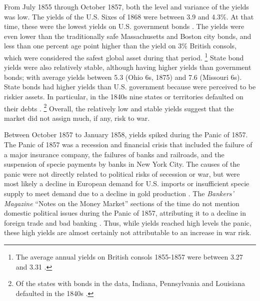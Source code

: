 \documentclass[]{article}\usepackage[]{graphicx}\usepackage[]{color}
\begin{document}
From July 1855 through October 1857, both the level and variance of the yields was low.
The yields of the U.S. Sixes of 1868 were between 3.9 and 4.3\%.
At that time, these were the lowest yields on U.S. government bonds \parencite[282-283]{HomerSylla2005}.
The yields were even lower than the traditionally safe Massachusetts and Boston city bonds, and less than one percent age point higher than the yield on 3\% British consols, which were considered the safest global asset during that period.%
\footnote{The average annual yields on British consols 1855-1857 were between 3.27 and 3.31 \parencite[193]{HomerSylla2005}.}
State bond yields were also relatively stable, although having higher yields than government bonds; with average yields between 5.3 (Ohio 6s, 1875) and 7.6 (Missouri 6s).
State bonds had higher yields than U.S. government because were perceived to be riskier assets.
In particular, in the 1840s nine states or territories defaulted on their debts \parencite{English1996}.%
\footnote{Of the states with bonds in the data, Indiana, Pennsylvania and Louisiana defaulted in the 1840s \parencite[265]{English1996}.}
Overall, the relatively low and stable yields suggest that the market did not assign much, if any, risk to war.

Between October 1857 to January 1858, yields spiked during the Panic of 1857.
The Panic of 1857 was a recession and financial crisis that included the failure of a major insurance company, the failures of banks and railroads, and the suspension of specie payments by banks in New York City.
The causes of the panic were not directly related to political risks of secession or war, but were most likely a decline in European demand for U.S. imports or insufficient specie supply to meet demand due to a decline in gold production \parencites[263-265]{Dewey1918}[277,299]{HomerSylla2005}[337]{BankersMagazine1857}.
The \textit{Bankers' Magazine} ``Notes on the Money Market'' sections of the time do not mention domestic political issues during the Panic of 1857, attributing it to a decline in foreign trade and bad banking \parencite[337]{BankersMagazine1857}.
Thus, while yields reached high levels the panic, these high yields are almost certainly not attributable to an increase in war risk.
\end{document}
